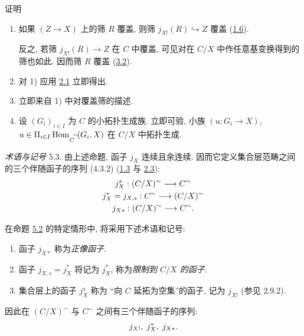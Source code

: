 \begin{enonce*}[remark]{证明}
\begin{enumerate}
\renewcommand{\labelenumi}{\theenumi)}
\item 如果\pageoriginale{} $(Z\rightarrow X)$ 上的筛 $R$ 覆盖,
则筛 $j_{X!}(R)\hookrightarrow Z$ 覆盖 (\hyperref[III.prop1.6]{1.6}).

反之, 若筛 $j_{X!}(R)\rightarrow Z$ 在 $C$ 中覆盖,
可见对在 $C/X$ 中作任意基变换得到的筛也如此.
因而筛 $R$ 覆盖 (\hyperref[III.prop3.2]{3.2}).

\item 对 1) 应用 \hyperref[III.def2.1]{2.1} 立即得出.

\item 立即来自 1) 中对覆盖筛的描述.

\item 设 $(G_i)_{i\in I}$ 为 $C$ 的小拓扑生成族.
立即可验, 小族 $(u:G_i\rightarrow X)$,
$u\in \amalg_{i\in I}\operatorname{Hom}_{C^{\widehat{\phantom{,}}}}(G_i, X)$ 在 $C/X$ 中拓扑生成.
\end{enumerate}
\end{enonce*}

\label{sga4.exp.III.terminology.5.3}\label{III.subsec5.3}%
\noindent \emph{术语与记号} 5.3. 由上述命题, 函子 $j_X$ 连续且余连续.
因而它定义集合层范畴之间的三个伴随函子的序列 (4.3.2)
(\hyperref[III.prop1.3]{1.3} 与 \hyperref[III.prop2.3]{2.3}):
\begin{gather*}
j^s_X:(C/X)^{\sim}\longrightarrow
C^{\sim}\\
j^{\ast}_X=j_{X,s}:C^{\sim}\longrightarrow
(C/X)^{\sim}\\
j_{X\ast}:(C/X)^{\sim}\longrightarrow C^{\sim}{}.
\end{gather*}

在命题 \hyperref[III.prop5.2]{5.2} 的特定情形中, 将采用下述术语和记号:
\begin{enumerate}
\renewcommand{\labelenumi}{\theenumi)}
\item 函子 $j_{X\ast}$ 称为\emph{正像函子}.

\item 函子 $j_{X,s}=j^{\ast}_X$ 将记为 $j^{\ast}_X$,
称为\emph{限制到 $C/X$ 的函子}.

\item 集合层上的\pageoriginale{}函子 $j^s_X$ 称为
“向 $C$ 延拓为空集”的函子, 记为 $j_{X!}$ (参见 2.9.2).
\end{enumerate}

因此在 $(C/X)^{\sim}$ 与 $C^{\sim}$ 之间有三个伴随函子的序列:
$$
j_{X!},\; j^{\ast}_X,\; j_{X\ast}{}.
$$

